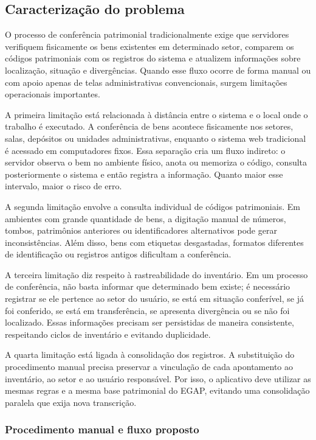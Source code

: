 \documentclass[12pt,a4paper]{article}
\begin{document}
\subsection{Caracterização do problema}

O processo de conferência patrimonial tradicionalmente exige que servidores verifiquem fisicamente os bens existentes em determinado setor, comparem os códigos patrimoniais com os registros do sistema e atualizem informações sobre localização, situação e divergências. Quando esse fluxo ocorre de forma manual ou com apoio apenas de telas administrativas convencionais, surgem limitações operacionais importantes.

A primeira limitação está relacionada à distância entre o sistema e o local onde o trabalho é executado. A conferência de bens acontece fisicamente nos setores, salas, depósitos ou unidades administrativas, enquanto o sistema web tradicional é acessado em computadores fixos. Essa separação cria um fluxo indireto: o servidor observa o bem no ambiente físico, anota ou memoriza o código, consulta posteriormente o sistema e então registra a informação. Quanto maior esse intervalo, maior o risco de erro.

A segunda limitação envolve a consulta individual de códigos patrimoniais. Em ambientes com grande quantidade de bens, a digitação manual de números, tombos, patrimônios anteriores ou identificadores alternativos pode gerar inconsistências. Além disso, bens com etiquetas desgastadas, formatos diferentes de identificação ou registros antigos dificultam a conferência.

A terceira limitação diz respeito à rastreabilidade do inventário. Em um processo de conferência, não basta informar que determinado bem existe; é necessário registrar se ele pertence ao setor do usuário, se está em situação conferível, se já foi conferido, se está em transferência, se apresenta divergência ou se não foi localizado. Essas informações precisam ser persistidas de maneira consistente, respeitando ciclos de inventário e evitando duplicidade.

A quarta limitação está ligada à consolidação dos registros. A substituição do procedimento manual precisa preservar a vinculação de cada apontamento ao inventário, ao setor e ao usuário responsável. Por isso, o aplicativo deve utilizar as mesmas regras e a mesma base patrimonial do EGAP, evitando uma consolidação paralela que exija nova transcrição.

\subsubsection{Procedimento manual e fluxo proposto}
\end{document}
